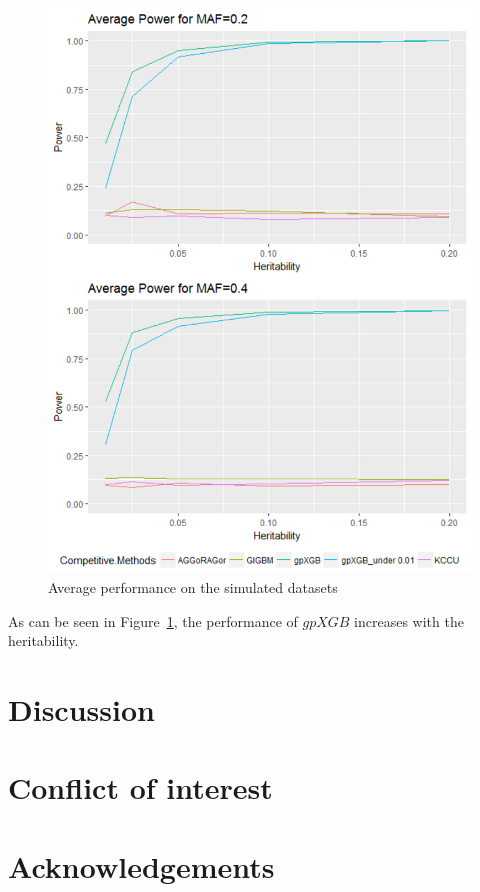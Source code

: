 \documentclass[11pt]{article}
\theoremstyle{plain}
\theoremstyle{definition}
\theoremstyle{remark}
\begin{document}
\begin{figure}[H]
    \begin{center}
       \includegraphics[scale=0.5]{Rplot01}
    \end{center}
\caption{\label{avg}Average performance on the simulated datasets}
\end{figure}

As can be seen in Figure~\ref{avg}, the performance of $gpXGB$ increases with the heritability.


\section{Discussion}

\section{Conflict of interest}

\section{Acknowledgements}
\end{document}
